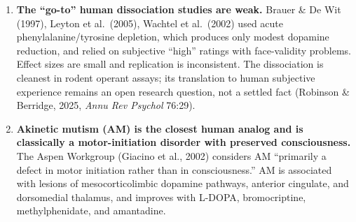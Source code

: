 \begin{enumerate}
  \begin{itemize}
  \tightlist
  \item
    \textbf{D2 blockade blunts pleasure in healthy volunteers.} Weber et al.~(2023, \emph{J Psychiatr Res}; PMID 36680855): a single 300 mg dose of amisulpride vs.~placebo, n=85, double-blind RCT, produced significantly lower positivity ratings across \emph{all} stimulus categories (p=.026) and lower electrodermal responses (p=.017). Authors: D2 blockade ``can reduce at-the-moment hedonic responsivity in healthy volunteers,'' and antipsychotics likely contribute to clinical anhedonia via D2 antagonism.
  \item
    \textbf{Antipsychotic-induced anhedonia is clinically well-documented} (PMC4826766): first-generation antipsychotics produce apathy, anhedonia, and loss of drive, with depression in 20--40\% of patients --- patient reports describe emotional blunting and reduced capacity for pleasure, not merely reduced pursuit.
  \item
    \textbf{Parkinson's anhedonia is real and sometimes dopamine-unresponsive.} Costello et al.~(2025, \emph{Brain}; PMC12129732): PD depression is ``characterized by lower acceptance of offers, driven by markedly lower incentivization by reward (reward sensitivity).''
  \item
    \textbf{Primate dopamine loss impairs reward behavior writ large} (Wang et al., PMC4600774): heavy DA loss in rhesus impairs morphine CPP --- the opposite of what a clean wanting/liking dissociation predicts.
  \end{itemize}
\item
  \textbf{The ``go-to'' human dissociation studies are weak.} Brauer \& De Wit (1997), Leyton et al.~(2005), Wachtel et al.~(2002) used acute phenylalanine/tyrosine depletion, which produces only modest dopamine reduction, and relied on subjective ``high'' ratings with face-validity problems. Effect sizes are small and replication is inconsistent. The dissociation is cleanest in rodent operant assays; its translation to human subjective experience remains an open research question, not a settled fact (Robinson \& Berridge, 2025, \emph{Annu Rev Psychol} 76:29).
\item
  \textbf{Akinetic mutism (AM) is the closest human analog and is classically a motor-initiation disorder with preserved consciousness.} The Aspen Workgroup (Giacino et al., 2002) considers AM ``primarily a defect in motor initiation rather than in consciousness.'' AM is associated with lesions of mesocorticolimbic dopamine pathways, anterior cingulate, and dorsomedial thalamus, and improves with L-DOPA, bromocriptine, methylphenidate, and amantadine.

\end{enumerate}
